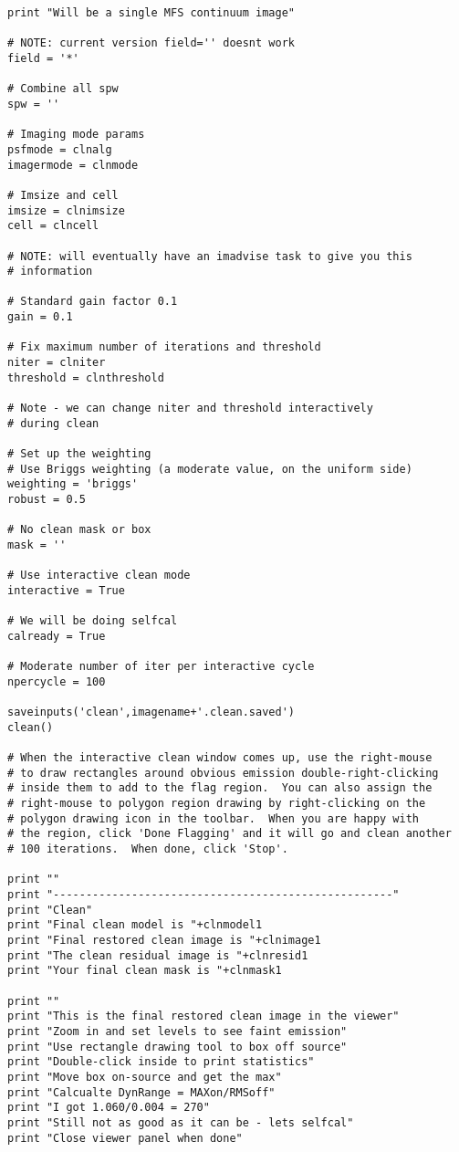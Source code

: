 \begin{verbatim}
print "Will be a single MFS continuum image"

# NOTE: current version field='' doesnt work
field = '*'

# Combine all spw
spw = ''

# Imaging mode params
psfmode = clnalg
imagermode = clnmode

# Imsize and cell
imsize = clnimsize
cell = clncell

# NOTE: will eventually have an imadvise task to give you this
# information

# Standard gain factor 0.1
gain = 0.1

# Fix maximum number of iterations and threshold
niter = clniter
threshold = clnthreshold

# Note - we can change niter and threshold interactively
# during clean

# Set up the weighting
# Use Briggs weighting (a moderate value, on the uniform side)
weighting = 'briggs'
robust = 0.5

# No clean mask or box
mask = ''

# Use interactive clean mode
interactive = True

# We will be doing selfcal
calready = True

# Moderate number of iter per interactive cycle
npercycle = 100

saveinputs('clean',imagename+'.clean.saved')
clean()

# When the interactive clean window comes up, use the right-mouse
# to draw rectangles around obvious emission double-right-clicking
# inside them to add to the flag region.  You can also assign the
# right-mouse to polygon region drawing by right-clicking on the
# polygon drawing icon in the toolbar.  When you are happy with
# the region, click 'Done Flagging' and it will go and clean another
# 100 iterations.  When done, click 'Stop'.

print ""
print "----------------------------------------------------"
print "Clean"
print "Final clean model is "+clnmodel1
print "Final restored clean image is "+clnimage1
print "The clean residual image is "+clnresid1
print "Your final clean mask is "+clnmask1

print ""
print "This is the final restored clean image in the viewer"
print "Zoom in and set levels to see faint emission"
print "Use rectangle drawing tool to box off source"
print "Double-click inside to print statistics"
print "Move box on-source and get the max"
print "Calcualte DynRange = MAXon/RMSoff"
print "I got 1.060/0.004 = 270"
print "Still not as good as it can be - lets selfcal"
print "Close viewer panel when done"


\end{verbatim}
